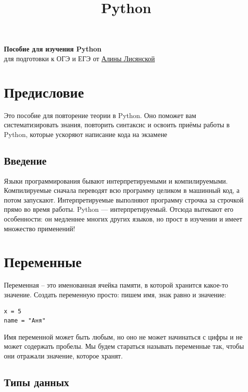 \documentclass[12pt,a4paper]{article}
\title{Python}
\begin{document}
\begin{center}
\Large \textbf{Пособие для изучения Python} \\
\normalsize для подготовки к ОГЭ и ЕГЭ от \href{https://t.me/kvinnen}{Алины Лисянской}
\end{center}

\tableofcontents
\section*{Предисловие}

Это пособие для повторение теории в Python. Оно поможет вам систематизировать знания, повторить синтаксис и освоить приёмы работы в Python, которые ускоряют написание кода на экзамене

\subsection*{Введение}

Языки программирования бывают интерпретируемыми и компилируемыми. Компилируемые сначала переводят всю программу целиком в машинный код, а потом запускают. Интерпретируемые выполняют программу строчка за строчкой прямо во время работы. Python --- интерпретируемый. Отсюда вытекают его особенности: он медленнее многих других языков, но прост в изучении и имеет множество применений!

\section*{Переменные}

Переменная -- это именованная ячейка памяти, в которой хранится какое-то значение. Создать переменную просто: пишем имя, знак равно и значение:

\begin{verbatim}
x = 5
name = "Аня"
\end{verbatim}

Имя переменной может быть любым, но оно не может начинаться с цифры и не может содержать пробелы. Мы будем стараться называть переменные так, чтобы они отражали значение, которое хранят.
\medskip

\subsection*{Типы данных}
\end{document}

